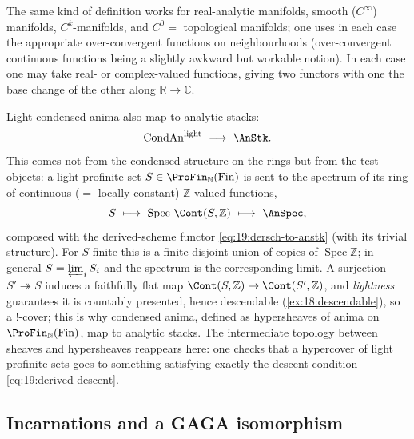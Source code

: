 \begin{remark}
\label{rmk:19:manifold-flavours}
The same kind of definition works for real-analytic manifolds, smooth ($C^\infty$)
manifolds, $C^k$-manifolds, and $C^0=$ topological manifolds; one uses in each
case the appropriate over-convergent functions on neighbourhoods (over-convergent
continuous functions being a slightly awkward but workable notion). In each case
one may take real- or complex-valued functions, giving two functors with one the
base change of the other along $\mathbb R\to\mathbb C$.
\end{remark}

\begin{example}
\label{ex:19:condensed-anima}
Light condensed anima also map to analytic stacks:
\begin{equation*}
\operatorname{CondAn}^{\mathrm{light}}\ \longrightarrow\ \AnStk .
\end{equation*}
This comes not from the condensed structure on the rings but from the test
objects: a light profinite set $S\in\ProFin_{\mathbb N}(\mathrm{Fin})$ is sent to
the spectrum of its ring of continuous ($=$ locally constant) $\mathbb Z$-valued
functions,
\begin{equation*}
S\ \longmapsto\ \operatorname{Spec}\,\Cont(S,\mathbb Z)\ \longmapsto\ \AnSpec ,
\end{equation*}
composed with the derived-scheme functor \eqref{eq:19:dersch-to-anstk} (with its
trivial structure). For $S$ finite this is a finite disjoint union of copies of
$\operatorname{Spec}\mathbb Z$; in general $S=\varprojlim_i S_i$ and the spectrum
is the corresponding limit. A surjection $S'\twoheadrightarrow S$ induces a
faithfully flat map $\Cont(S,\mathbb Z)\to\Cont(S',\mathbb Z)$, and
\emph{lightness} guarantees it is countably presented, hence descendable
(\cref{ex:18:descendable}), so a $!$-cover; this is why condensed anima, defined
as hypersheaves of anima on $\ProFin_{\mathbb N}(\mathrm{Fin})$, map to analytic
stacks. The intermediate topology between sheaves and hypersheaves reappears here:
one checks that a hypercover of light profinite sets goes to something satisfying
exactly the descent condition \eqref{eq:19:derived-descent}.
\end{example}

\subsection{Incarnations and a GAGA isomorphism}
\label{subsec:19:incarnations}


